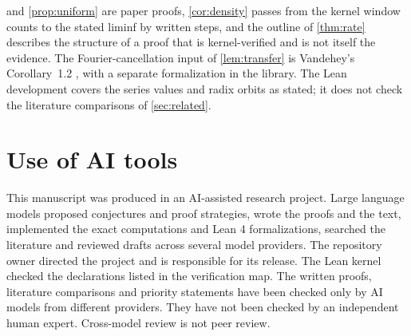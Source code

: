\documentclass[11pt]{article}
\begin{document}
 and \cref{prop:uniform} are paper proofs, \cref{cor:density} passes from the kernel window counts to the stated liminf by written steps, and the outline of \cref{thm:rate} describes the structure of a proof that is kernel-verified and is not itself the evidence. The Fourier-cancellation input of \cref{lem:transfer} is Vandehey's Corollary~1.2 \cite{vandehey}, with a separate formalization in the library. The Lean development covers the series values and radix orbits as stated; it does not check the literature comparisons of \cref{sec:related}.

\section{Use of AI tools}\label{sec:ai}
This manuscript was produced in an AI-assisted research project. Large language models proposed conjectures and proof strategies, wrote the proofs and the text, implemented the exact computations and Lean 4 formalizations, searched the literature and reviewed drafts across several model providers. The repository owner directed the project and is responsible for its release. The Lean kernel checked the declarations listed in the verification map. The written proofs, literature comparisons and priority statements have been checked only by AI models from different providers. They have not been checked by an independent human expert. Cross-model review is not peer review.

\begingroup
\small


\endgroup
\end{document}

